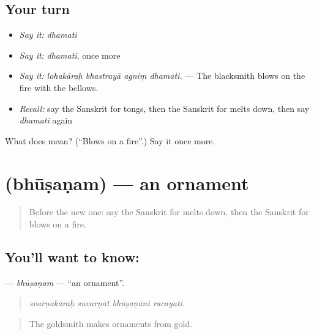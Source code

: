 \subsection*{Your turn}
\begin{itemize}
\raggedright
  \item \emph{Say it:} \emph{dhamati}
  \item \emph{Say it:} \emph{dhamati}, once more
  \item \emph{Say it:} \emph{lohakāraḥ bhastrayā agniṃ dhamati.} — The blacksmith blows on the fire with the bellows.
  \item \emph{Recall:} say the Sanskrit for tongs, then the Sanskrit for melts down, then say \emph{dhamati} again
\end{itemize}

\begin{tcolorbox}[breakable,colback=teal!4,colframe=teal!35!black,title={Before you move on}]
What does  mean? (\textquotedblleft{}Blows on a fire\textquotedblright{}.) Say it once more.
\end{tcolorbox}
\section[\texorpdfstring{\sk{भूषणम्} (bhūṣaṇam)}{भूषणम् (bhūṣaṇam)}]{ (bhūṣaṇam) — an ornament}

\label{lesson:SA-C507-bhusanam}



\begin{quote}
Before the new one: say the Sanskrit for melts down, then the Sanskrit for blows on a fire.
\end{quote}

\subsection*{You'll want to know: }
\textbf{} — \emph{bhūṣaṇam} — \textquotedblleft{}an ornament\textquotedblright{}.

\begin{quote}
   
\end{quote}

\begin{quote}
\emph{svarṇakāraḥ suvarṇāt bhūṣaṇāni racayati.}
\end{quote}

\begin{quote}
The goldsmith makes ornaments from gold.
\end{quote}

